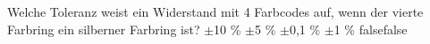     {Welche Toleranz weist ein Widerstand mit 4 Farbcodes auf, wenn der vierte Farbring ein silberner Farbring ist?}
    { $±$10 \%}
    { $±$5 \%}
    { $±$0,1 \%}
    { $±$1 \%}
    {false}{false}